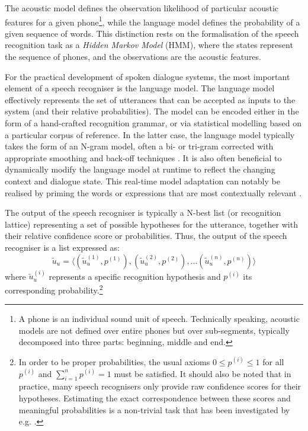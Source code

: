 The acoustic model defines the observation likelihood of particular acoustic features for a given phone\footnote{A phone is an individual sound unit of speech.  Technically speaking, acoustic models are not defined over entire phones but over sub-segments, typically decomposed into three parts: beginning, middle and end.}, while the language model defines the probability of a given sequence of words. This distinction rests on the formalisation of the speech recognition task as a \textit{Hidden Markov Model} (HMM), where the states represent the sequence of phones, and the observations are the acoustic features.  


For the practical development of spoken dialogue systems, the most important element of a speech recogniser is the language model.  The language model effectively represents the set of utterances that can be accepted as inputs to the system (and their relative probabilities).  The model can be encoded either in the form of a hand-crafted recognition grammar, or via statistical modelling based on a particular corpus of reference.  In the latter case, the language model typically takes the form of an N-gram model, often a bi- or tri-gram corrected with appropriate smoothing and back-off techniques  \citep{Jelinek:1998,ChenG99}.  It is also often beneficial to dynamically modify the language model at runtime to reflect the changing context and dialogue state.  This real-time model adaptation can notably be realised by priming the words or expressions that are most contextually relevant \citep{gruenstein2005context,ESSLLI2008-springerreprint}.

The output of the speech recogniser is typically a N-best list (or recognition lattice) representing a set of possible hypotheses for the utterance, together with their relative confidence score or probabilities.  Thus, the output of the speech recogniser is a list expressed as: 
\begin{equation*}
\tilde{u}_u = \langle (\tilde{u}_u^{(1)}, p^{(1)}), (\tilde{u}_u^{(2)}, p^{(2)}), ... (\tilde{u}_u^{(n)}, p^{(n)})\rangle
\end{equation*}
where $\tilde{u}_u^{(i)}$ represents a specific recognition hypothesis and $p^{(i)}$ its corresponding probability.\footnote{In order to be proper probabilities,  the usual axioms $0 \leq p^{(i)} \leq 1$ for all $p^{(i)}$ and $\sum_{i=1}^n p^{(i)} = 1$ must be satisfied.   It should also be noted that in practice, many speech recognisers only provide raw confidence scores for their hypotheses.  Estimating the exact correspondence between these scores and meaningful probabilities is a non-trivial task that has been investigated by e.g. \cite{Williams08}.} 

